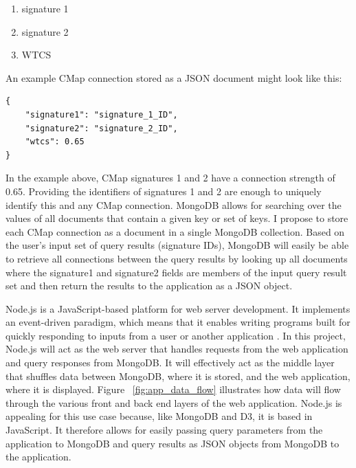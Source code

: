 \documentclass[12pt]{article}
\begin{document}
\begin{enumerate}
\item signature 1
\item signature 2
\item WTCS
\end{enumerate}

An example CMap connection stored as a JSON document might look like this:

\begin{lstlisting}
{
	"signature1": "signature_1_ID",
	"signature2": "signature_2_ID",
	"wtcs": 0.65
}
\end{lstlisting}
	
In the example above, CMap signatures 1 and 2 have a connection strength of 0.65. Providing the identifiers of signatures 1 and 2 are enough to uniquely identify this and any CMap connection. MongoDB allows for searching over the values of all documents that contain a given key or set of keys. I propose to store each CMap connection as a document in a single MongoDB collection. Based on the user's input set of query results (signature IDs), MongoDB will easily be able to retrieve all connections between the query results by looking up all documents where the signature1 and signature2 fields are members of the input query result set and then return the results to the application as a JSON object.

Node.js is a JavaScript-based platform for web server development. It implements an event-driven paradigm, which means that it enables writing programs built for quickly responding to inputs from a user or another application \cite{node}. In this project, Node.js will act as the web server that handles requests from the web application and query responses from MongoDB. It will effectively act as the middle layer that shuffles data between MongoDB, where it is stored, and the web application, where it is displayed. Figure ~\ref{fig:app_data_flow} illustrates how data will flow through the various front and back end layers of the web application. Node.js is appealing for this use case because, like MongoDB and D3, it is based in JavaScript. It therefore allows for easily passing query parameters from the application to MongoDB and query results as JSON objects from MongoDB to the application.
\end{document}
